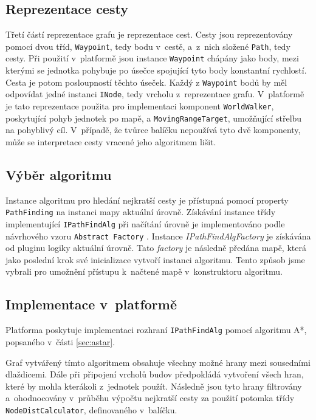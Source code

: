 \subsection{Reprezentace cesty}
\label{sec:path}
Třetí částí reprezentace grafu je reprezentace cest. Cesty jsou reprezentovány pomocí dvou tříd, \texttt{Waypoint}, tedy bodu v~cestě, a~z~nich složené \texttt{Path}, tedy cesty. Při použití v~platformě jsou instance \texttt{Waypoint} chápány jako body, mezi kterými se jednotka pohybuje po úsečce spojující tyto body konstantní rychlostí. Cesta je potom posloupností těchto úseček. Každý z \texttt{Waypoint} bodů by měl odpovídat jedné instanci \texttt{INode}, tedy vrcholu z~reprezentace grafu. V~platformě je tato reprezentace použita pro implementaci komponent \texttt{WorldWalker}, poskytující pohyb jednotek po mapě, a \texttt{MovingRangeTarget}, umožňující střelbu na pohyblivý cíl. V~případě, že tvůrce balíčku nepoužívá tyto dvě komponenty, může se interpretace cesty vracené jeho algoritmem lišit.


\subsection{Výběr algoritmu}
\label{sec:pathfindselection}
Instance algoritmu pro hledání nejkratší cesty je přístupná pomocí property \texttt{PathFinding} na instanci mapy aktuální úrovně. Získávání instance třídy implementující \texttt{IPathFindAlg} při načítání úrovně je implementováno podle návrhového vzoru \texttt{Abstract Factory} \citep[str.~87]{book:gangoffour}. Instance \textit{IPathFindAlgFactory} je získávána od pluginu logiky aktuální úrovně. Tato \textit{factory} je následně předána mapě, která jako poslední krok své inicializace vytvoří instanci algoritmu. Tento způsob jsme vybrali pro umožnění přístupu k~načtené mapě v~konstruktoru algoritmu.

\subsection{Implementace v~platformě}
Platforma poskytuje implementaci rozhraní \texttt{IPathFindAlg} pomocí algoritmu A*, popsaného v~části \ref{sec:astar}. 

Graf vytvářený tímto algoritmem obsahuje všechny možné hrany mezi sousedními dlaždicemi. Dále při připojení vrcholů budov předpokládá vytvoření všech hran, které by mohla kterákoli z~jednotek použít. Následně jsou tyto hrany filtrovány a~ohodnocovány v~průběhu výpočtu nejkratší cesty za použití potomka třídy \texttt{NodeDistCalculator}, definovaného v~balíčku. 

